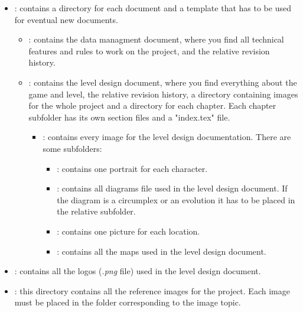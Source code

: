 \begin{itemize}
\item \textbf{}: contains a directory for each document and a template that has to be used for eventual new documents.
  \begin{itemize}
    \item \textbf{}: contains the data managment document, where you find all technical features and rules to work on the project, and the relative revision history.

    \item \textbf{}: contains the level design document, where you find everything about the game and level, the relative revision history, a directory containing images for the whole project and a directory for each chapter. Each chapter subfolder has its own section files and a "index.tex" file.
    \begin{itemize}
    \item \textbf{}: contains every image for the level design documentation. There are some subfolders:
    \begin{itemize}
      \item \textbf{}: contains one portrait for each character.
      \item \textbf{}: contains all diagrams file used in the level design document. If the diagram is a circumplex or an evolution it has to be placed in the relative subfolder.
        \item \textbf{}: contains one picture for each location.
        \item \textbf{}: contains all the maps used in the level design document.
    \end{itemize}
\end{itemize}
\end{itemize}
    \item \textbf{}: contains all the logos (\textit{.png} file) used in the level design document.

    \item \textbf{}: this directory contains all the reference images for the project. Each image must be placed in the folder corresponding to the image topic.

\end{itemize}

